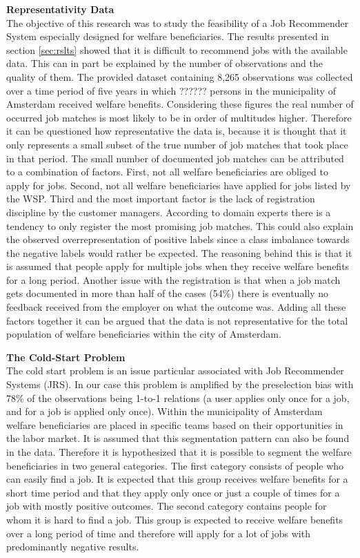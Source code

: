 \noindent
\textbf{Representativity Data}\\
The objective of this research was to study the feasibility of a Job Recommender System especially designed for welfare beneficiaries. 
The results presented in section \ref{sec:rslts} showed that it is difficult to recommend jobs with the available data.
This can in part be explained by the number of observations and the quality of them.
The provided dataset containing 8,265 observations was collected over a time period of five years in which ?????? persons in the municipality of Amsterdam received welfare benefits. %
Considering these figures the real number of occurred job matches is most likely to be in order of multitudes higher.
Therefore it can be questioned how representative the data is, because it is thought that it only represents a small subset of the true number of job matches that took place in that period.  
The small number of documented job matches can be attributed to a combination of factors.
First, not all welfare beneficiaries are obliged to apply for jobs.
Second, not all welfare beneficiaries have applied for jobs listed by the WSP.
Third and the most important factor is the lack of registration discipline by the customer managers.
According to domain experts there is a tendency to only register the most promising job matches.
This could also explain the observed overrepresentation of positive labels since a class imbalance towards the negative labels would rather be expected.
The reasoning behind this is that it is assumed that people apply for multiple jobs when they receive welfare benefits for a long period. 
Another issue with the registration is that when a job match gets documented in more than half of the cases (54\%) there is eventually no feedback received from the employer on what the outcome was.
Adding all these factors together it can be argued that the data is not representative for the total population of welfare beneficiaries within the city of Amsterdam. 

\noindent
\textbf{The Cold-Start Problem}\\
The cold start problem is an issue particular associated with Job Recommender Systems (JRS). In our case this problem is amplified by the preselection bias with 78\% of the observations being 1-to-1 relations (a user applies only once for a job, and for a job is applied only once). 
Within the municipality of Amsterdam welfare beneficiaries are placed in specific teams based on their opportunities in the labor market.
It is assumed that this segmentation pattern can also be found in the data.
Therefore it is hypothesized that it is possible to segment the welfare beneficiaries in two general categories.
The first category consists of people who can easily find a job. 
It is expected that this group receives welfare benefits for a short time period and that they apply only once or just a couple of times for a job with mostly positive outcomes. 
The second category contains people for whom it is hard to find a job. 
This group is expected to receive welfare benefits over a long period of time and therefore will apply for a lot of jobs with predominantly negative results.


